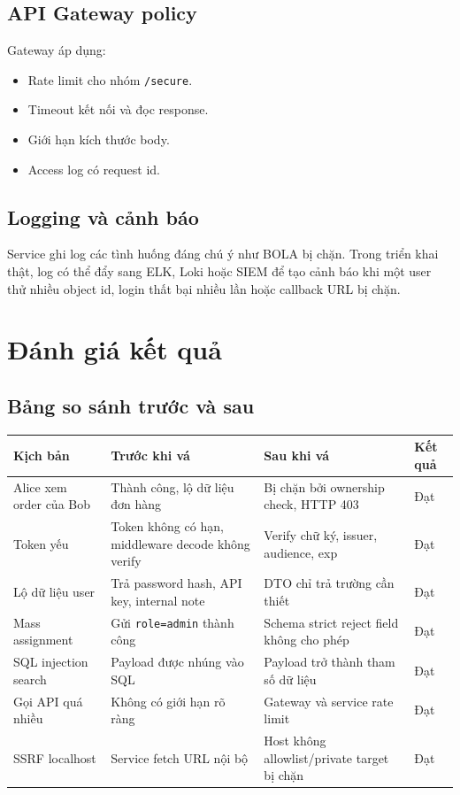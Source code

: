 \documentclass[12pt,a4paper]{report}
\begin{document}
\section{API Gateway policy}
Gateway áp dụng:
\begin{itemize}
  \item Rate limit cho nhóm \texttt{/secure}.
  \item Timeout kết nối và đọc response.
  \item Giới hạn kích thước body.
  \item Access log có request id.
\end{itemize}

\section{Logging và cảnh báo}
Service ghi log các tình huống đáng chú ý như BOLA bị chặn. Trong triển khai thật, log có thể đẩy sang ELK, Loki hoặc SIEM để tạo cảnh báo khi một user thử nhiều object id, login thất bại nhiều lần hoặc callback URL bị chặn.

\chapter{Đánh giá kết quả}

\section{Bảng so sánh trước và sau}
\begin{longtable}{p{3.5cm}p{4.2cm}p{4.2cm}p{2.3cm}}
\toprule
\textbf{Kịch bản} & \textbf{Trước khi vá} & \textbf{Sau khi vá} & \textbf{Kết quả}\\
\midrule
Alice xem order của Bob & Thành công, lộ dữ liệu đơn hàng & Bị chặn bởi ownership check, HTTP 403 & Đạt\\
Token yếu & Token không có hạn, middleware decode không verify & Verify chữ ký, issuer, audience, exp & Đạt\\
Lộ dữ liệu user & Trả password hash, API key, internal note & DTO chỉ trả trường cần thiết & Đạt\\
Mass assignment & Gửi \texttt{role=admin} thành công & Schema strict reject field không cho phép & Đạt\\
SQL injection search & Payload được nhúng vào SQL & Payload trở thành tham số dữ liệu & Đạt\\
Gọi API quá nhiều & Không có giới hạn rõ ràng & Gateway và service rate limit & Đạt\\
SSRF localhost & Service fetch URL nội bộ & Host không allowlist/private target bị chặn & Đạt\\
\bottomrule
\end{longtable}
\end{document}
